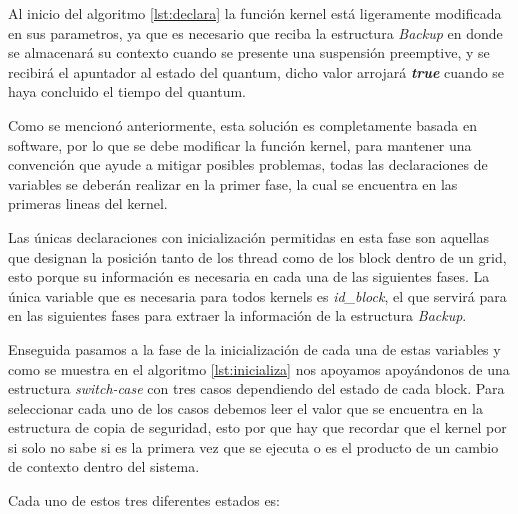 Al inicio del algoritmo \ref{lst:declara} la función kernel está ligeramente modificada en sus parametros, ya que es necesario que reciba la estructura \textit{Backup} en donde se almacenará su contexto cuando se presente una suspensión preemptive, y se recibirá el apuntador al estado del quantum, dicho valor arrojará \textbf{\textit{true}} cuando se haya concluido el tiempo del quantum.
\newline

Como se mencionó anteriormente, esta solución es completamente basada en software, por lo que se debe modificar la función kernel, para mantener una convención que ayude a mitigar posibles problemas, todas las declaraciones de variables se deberán realizar en la primer fase, la cual se encuentra en las primeras lineas del kernel.
\newline

Las únicas declaraciones con inicialización permitidas en esta fase son aquellas que designan la posición tanto de los thread como de los block dentro de un grid, esto porque  su información es necesaria en cada una de las siguientes fases. La única variable que es necesaria para todos kernels es \textit{id\_block}, el que servirá para en las siguientes fases para extraer la información de la estructura \textit{Backup}.



Enseguida pasamos a la fase de la inicialización de cada una de estas variables y como se muestra en el algoritmo \ref{lst:inicializa} nos apoyamos apoyándonos de una estructura \textit{switch-case} con tres casos dependiendo del estado de cada block. Para seleccionar cada uno de los casos debemos leer el valor que se encuentra en la estructura de copia de seguridad, esto por que hay que recordar que el kernel por si solo no sabe si es la primera vez que se ejecuta o es el producto de un cambio de contexto dentro del sistema.
\newline

Cada uno de estos tres diferentes estados es:

